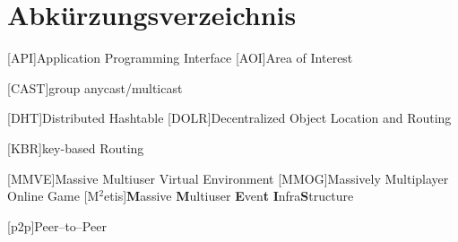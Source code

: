 \chapter*{Abkürzungsverzeichnis}

\pagestyle{useheadings}

\vspace{\topskip}


\begin{acronym}[xxxxxxxxxxxx]
	\setlength{\itemsep}{-\parsep}
	\setlength{\itemindent}{1.5em}
	[API]{Application Programming Interface}
	[AOI]{Area of Interest}

	\vspace{\parsep} 
 [CAST]{group anycast/multicast}

	\vspace{\parsep}
	 [DHT]{Distributed Hashtable}
	[DOLR]{Decentralized Object Location and Routing}



	
	
\vspace{\parsep}
[KBR]{key-based Routing}




	\vspace{\parsep}
	[MMVE]{Massive Multiuser Virtual Environment}
	[MMOG]{Massively Multiplayer Online Game}
	[M$^2$etis]{\textbf{M}assive \textbf{M}ultiuser \textbf{E}ven\textbf{t} \textbf{I}nfra\textbf{S}tructure}

	
	\vspace{\parsep}
	[p2p]{Peer--to--Peer}

	

	

\end{acronym}
